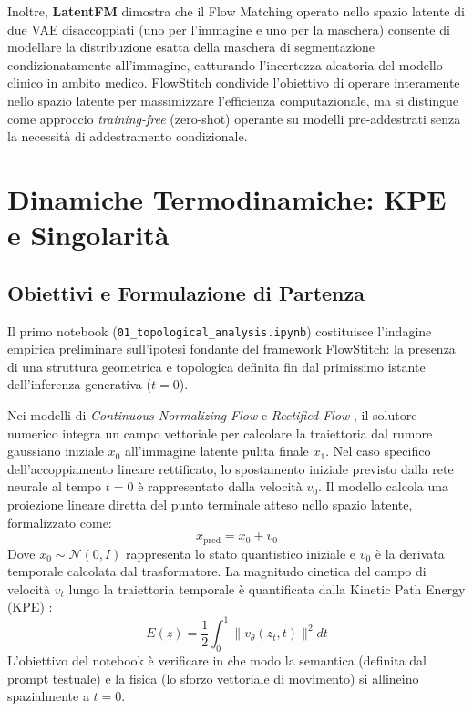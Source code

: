 \documentclass[12pt,a4paper]{report}
\begin{document}
Inoltre, \textbf{LatentFM} \cite{latentfm2025} dimostra che il Flow Matching operato nello spazio latente di due VAE disaccoppiati (uno per l'immagine e uno per la maschera) consente di modellare la distribuzione esatta della maschera di segmentazione condizionatamente all'immagine, catturando l'incertezza aleatoria del modello clinico in ambito medico. FlowStitch condivide l'obiettivo di operare interamente nello spazio latente per massimizzare l'efficienza computazionale, ma si distingue come approccio \textit{training-free} (zero-shot) operante su modelli pre-addestrati senza la necessità di addestramento condizionale.

\chapter{Dinamiche Termodinamiche: KPE e Singolarità}
\section{Obiettivi e Formulazione di Partenza}
Il primo notebook (\texttt{01\_topological\_analysis.ipynb}) costituisce l'indagine empirica preliminare sull'ipotesi fondante del framework FlowStitch: la presenza di una struttura geometrica e topologica definita fin dal primissimo istante dell'inferenza generativa ($t=0$). 

Nei modelli di \textit{Continuous Normalizing Flow} e \textit{Rectified Flow} \cite{lipman2023flow, liu2022flow}, il solutore numerico integra un campo vettoriale per calcolare la traiettoria dal rumore gaussiano iniziale $x_0$ all'immagine latente pulita finale $x_1$. Nel caso specifico dell'accoppiamento lineare rettificato, lo spostamento iniziale previsto dalla rete neurale al tempo $t=0$ è rappresentato dalla velocità $v_0$. Il modello calcola una proiezione lineare diretta del punto terminale atteso nello spazio latente, formalizzato come:
\begin{equation}
    x_{\text{pred}} = x_0 + v_0
\end{equation}
Dove $x_0 \sim \mathcal{N}(0, I)$ rappresenta lo stato quantistico iniziale e $v_0$ è la derivata temporale calcolata dal trasformatore. La magnitudo cinetica del campo di velocità $v_t$ lungo la traiettoria temporale è quantificata dalla Kinetic Path Energy (KPE) \cite{enfopath2025}:
\begin{equation}
    E(z) = \frac{1}{2} \int_0^1 \|v_\theta(z_t, t)\|^2 dt
\end{equation}
L'obiettivo del notebook è verificare in che modo la semantica (definita dal prompt testuale) e la fisica (lo sforzo vettoriale di movimento) si allineino spazialmente a $t=0$.
\end{document}
